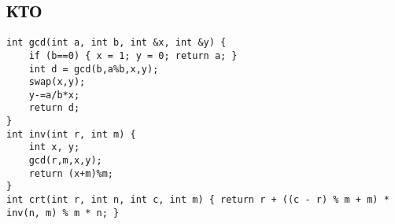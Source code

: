 \subsection{КТО}
\begin{lstlisting}
int gcd(int a, int b, int &x, int &y) {
    if (b==0) { x = 1; y = 0; return a; }
    int d = gcd(b,a%b,x,y);
    swap(x,y);
    y-=a/b*x;
    return d;
}
int inv(int r, int m) {
    int x, y;
    gcd(r,m,x,y);
    return (x+m)%m;
}
int crt(int r, int n, int c, int m) { return r + ((c - r) % m + m) * inv(n, m) % m * n; }
\end{lstlisting}

